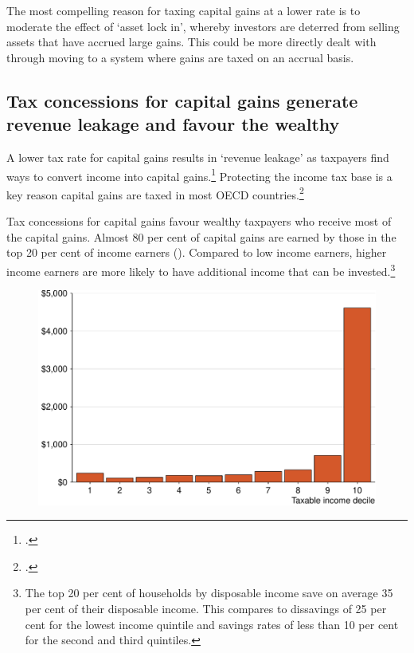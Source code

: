 \documentclass{grattan}\usepackage[]{graphicx}\usepackage[]{color}
\newcommand\gao{Grattan analysis of}
\begin{document}
The most compelling reason for taxing capital gains at a lower rate is to moderate the effect of `asset lock in', whereby investors are deterred from selling assets that have accrued large gains. This could be more directly dealt with through moving to a system where gains are taxed on an accrual basis.  

\subsection{Tax concessions for capital gains generate revenue leakage and favour the wealthy}
A lower tax rate for capital gains results in `revenue leakage' as taxpayers find ways to convert income into capital gains.\footcites{Evans2005}{Minas2013}  Protecting the income tax base is a key reason capital gains are taxed in most OECD countries.\footcite{OECD2006b}

Tax concessions for capital gains favour wealthy taxpayers who receive most of the capital gains. Almost 80 per cent of capital gains are earned by those in the top 20 per cent of income earners (). Compared to low income earners, higher income earners are more likely to have additional income that can be invested.\footnote{The top 20 per cent of households by disposable income save on average 35 per cent of their disposable income. This compares to dissavings of 25 per cent for the lowest income quintile and savings rates of less than 10 per cent for the second and third quintiles.}


\begin{figure}
\includegraphics[width=\columnwidth]{figure/Nearly_eighty_per_cent_of_capital_gains_are_earned_by_those_-1}
\source{\gao\ \textcite{ATO2013i}}
\end{figure}
\end{document}
